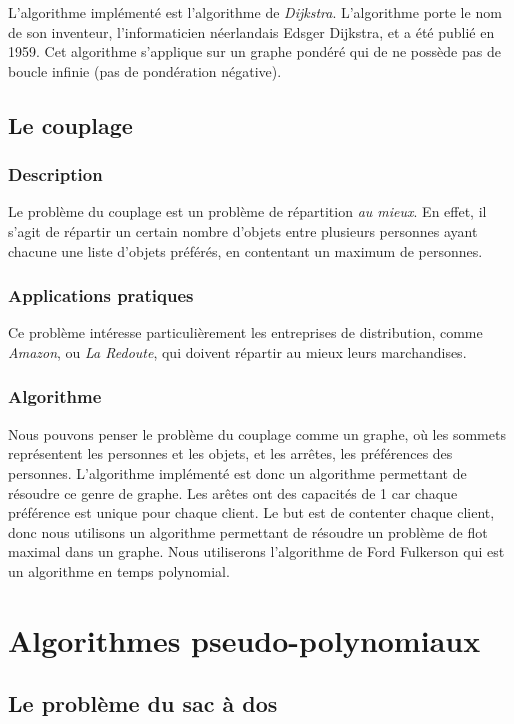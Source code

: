 	L'algorithme implémenté est l'algorithme de \emph{Dijkstra}. L'algorithme porte le nom de son inventeur, 
	l'informaticien néerlandais Edsger Dijkstra, et a été publié en 1959. Cet algorithme s'applique sur un graphe pondéré 
	qui de ne possède pas de boucle infinie (pas de pondération négative).

    \subsection{Le couplage}
        \subsubsection{Description}
            Le problème du couplage est un problème de répartition \emph{au mieux}.
            En effet, il s'agit de répartir un certain nombre d'objets
            entre plusieurs personnes ayant chacune une liste d'objets
            préférés, en contentant un maximum de personnes.
        \subsubsection{Applications pratiques}
            Ce problème intéresse particulièrement les entreprises
            de distribution, comme \emph{Amazon},
            ou \emph{La Redoute}, qui doivent
            répartir au mieux leurs marchandises.
        \subsubsection{Algorithme}
		Nous pouvons penser le problème du couplage comme un graphe,
		 où les sommets représentent les personnes et les objets,
		 et les arrêtes, les préférences des personnes.
		L'algorithme implémenté est donc un algorithme permettant
		 de résoudre ce genre de graphe.
		Les arêtes ont des capacités de 1 car chaque préférence est unique
		 pour chaque client.
		Le but est de contenter chaque client, donc nous utilisons un
		 algorithme permettant de résoudre un problème de flot maximal
		 dans un graphe. Nous utiliserons l'algorithme de Ford Fulkerson 
          		qui est un algorithme en temps polynomial.



\section{Algorithmes pseudo-polynomiaux}
    \subsection{Le problème du sac à dos}
